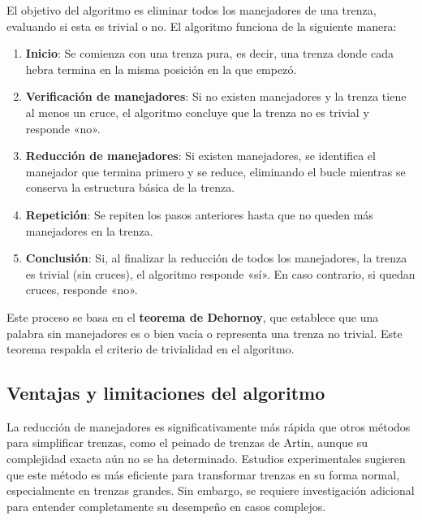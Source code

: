 El objetivo del algoritmo es eliminar todos los manejadores de una trenza, evaluando si esta es trivial o no. El algoritmo funciona de la siguiente manera:

\begin{enumerate}
    \item \textbf{Inicio}: Se comienza con una trenza pura, es decir, una trenza donde cada hebra termina en la misma posición en la que empezó.
    
    \item \textbf{Verificación de manejadores}: Si no existen manejadores y la trenza tiene al menos un cruce, el algoritmo concluye que la trenza no es trivial y responde «no».
    
    \item \textbf{Reducción de manejadores}: Si existen manejadores, se identifica el manejador que termina primero y se reduce, eliminando el bucle mientras se conserva la estructura básica de la trenza.
    
    \item \textbf{Repetición}: Se repiten los pasos anteriores hasta que no queden más manejadores en la trenza.
    
    \item \textbf{Conclusión}: Si, al finalizar la reducción de todos los manejadores, la trenza es trivial (sin cruces), el algoritmo responde «sí». En caso contrario, si quedan cruces, responde «no».
\end{enumerate}

Este proceso se basa en el \textbf{teorema de Dehornoy}, que establece que una palabra sin manejadores es o bien vacía o representa una trenza no trivial. Este teorema respalda el criterio de trivialidad en el algoritmo.

\subsection{Ventajas y limitaciones del algoritmo}

La reducción de manejadores es significativamente más rápida que otros métodos para simplificar trenzas, como el peinado de trenzas de Artin, aunque su complejidad exacta aún no se ha determinado. Estudios experimentales sugieren que este método es más eficiente para transformar trenzas en su forma normal, especialmente en trenzas grandes. Sin embargo, se requiere investigación adicional para entender completamente su desempeño en casos complejos.
